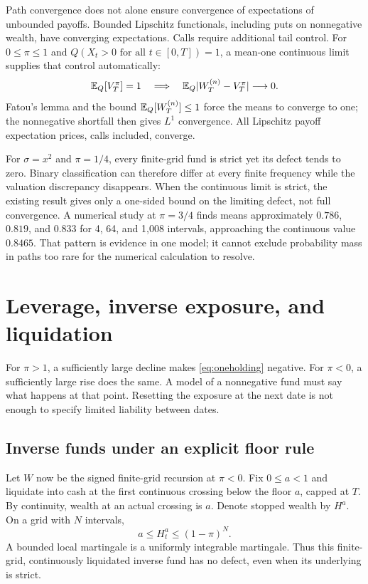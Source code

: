 Path convergence does not alone ensure convergence of expectations of
unbounded payoffs. Bounded Lipschitz functionals, including puts on
nonnegative wealth, have converging expectations. Calls require additional
tail control. For $0\leq\pi\leq1$ and
$Q(X_t>0\text{ for all }t\in[0,T])=1$, a mean-one continuous limit
supplies that control automatically:
\begin{equation}\label{eq:meanone}
 \mathbb{E}_Q[V_T^\pi]=1\quad\Longrightarrow\quad
 \mathbb{E}_Q|W_T^{(n)}-V_T^\pi|\longrightarrow0.
\end{equation}
Fatou's lemma and the bound $\mathbb{E}_Q[W_T^{(n)}]\leq1$ force the means to
converge to one; the nonnegative shortfall then gives $L^1$ convergence.
All Lipschitz payoff expectation prices, calls included, converge.

For $\sigma=x^2$ and $\pi=1/4$, every finite-grid fund is strict yet its
defect tends to zero. Binary classification can therefore differ at every
finite frequency while the valuation discrepancy disappears. When the
continuous limit is strict, the existing result gives only a one-sided
bound on the limiting defect, not full convergence. A numerical study at
$\pi=3/4$ finds means approximately $0.786$, $0.819$, and $0.833$ for
4, 64, and 1,008 intervals, approaching the continuous value $0.8465$.
That pattern is evidence in one model; it cannot exclude probability mass
in paths too rare for the numerical calculation to resolve.

\section{Leverage, inverse exposure, and liquidation}\label{sec:liquidation}
For $\pi>1$, a sufficiently large decline makes
\eqref{eq:oneholding} negative. For $\pi<0$, a sufficiently large rise does
the same. A model of a nonnegative fund must say what happens at that
point. Resetting the exposure at the next date is not enough to specify
limited liability between dates.

\subsection{Inverse funds under an explicit floor rule}
Let $W$ now be the signed finite-grid recursion at $\pi<0$. Fix
$0\leq a<1$ and liquidate into cash at the first continuous crossing
below the floor $a$, capped at $T$. By continuity, wealth at an actual
crossing is $a$. Denote stopped wealth by $H^a$. On a grid with $N$
intervals,
\begin{equation}\label{eq:inversebound}
 a\leq H_t^a\leq(1-\pi)^N.
\end{equation}
A bounded local martingale is a uniformly integrable martingale.
Thus this finite-grid, continuously liquidated inverse fund has no
defect, even when its underlying is strict.

